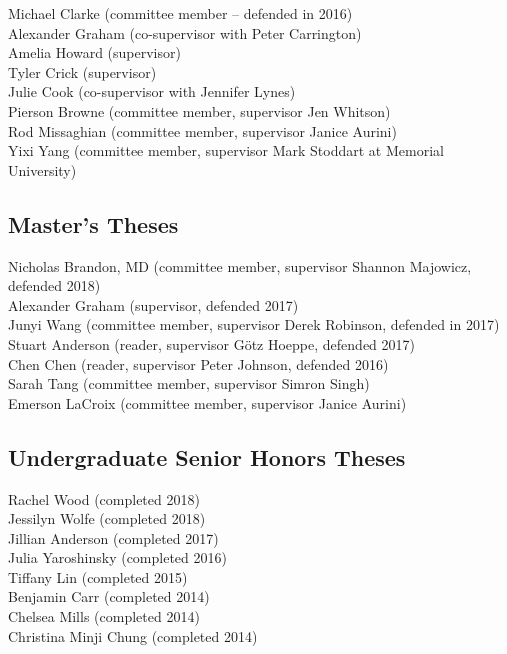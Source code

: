 \noindent Michael Clarke (committee member -- defended in 2016)\\
\noindent Alexander Graham (co-supervisor with Peter Carrington)\\
\noindent Amelia Howard (supervisor)\\
\noindent Tyler Crick (supervisor)\\
\noindent Julie Cook (co-supervisor with Jennifer Lynes)\\
\noindent Pierson Browne (committee member, supervisor Jen Whitson)\\
\noindent Rod Missaghian (committee member, supervisor Janice Aurini)\\
\noindent Yixi Yang (committee member, supervisor Mark Stoddart at
Memorial University)

\subsection{Master's Theses}\label{masters-theses}

\noindent Nicholas Brandon, MD (committee member, supervisor Shannon
Majowicz, defended 2018)\\
\noindent Alexander Graham (supervisor, defended 2017)\\
\noindent Junyi Wang (committee member, supervisor Derek Robinson,
defended in 2017)\\
\noindent Stuart Anderson (reader, supervisor Götz Hoeppe, defended
2017)\\
\noindent Chen Chen (reader, supervisor Peter Johnson, defended 2016)\\
\noindent Sarah Tang (committee member, supervisor Simron Singh)\\
\noindent Emerson LaCroix (committee member, supervisor Janice Aurini)

\subsection{Undergraduate Senior Honors
Theses}\label{undergraduate-senior-honors-theses}

\noindent Rachel Wood (completed 2018)\\
\noindent Jessilyn Wolfe (completed 2018)\\
\noindent Jillian Anderson (completed 2017)\\
\noindent Julia Yaroshinsky (completed 2016)\\
\noindent Tiffany Lin (completed 2015)\\
\noindent Benjamin Carr (completed 2014)\\
\noindent Chelsea Mills (completed 2014)\\
\noindent Christina Minji Chung (completed 2014)\\

